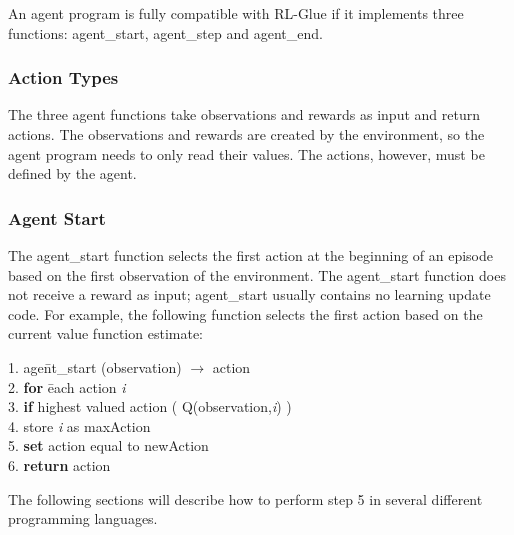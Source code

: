 \documentclass[11pt]{article}
\begin{document}
An agent program is fully compatible with RL-Glue if it implements three functions: agent\_start, agent\_step and agent\_end. 

\subsubsection{Action Types}
The three agent functions take observations and rewards as input and return actions. The observations and rewards are created by the environment, so the agent program needs to only read their values. The actions, however, must be defined by the agent.

\subsubsection{Agent Start}
The agent\_start function selects the first action at the beginning of an episode based on the first observation of the environment. The agent\_start function does not receive a reward as input; agent\_start usually contains no learning update code. For example, the following function selects the first action based on the current value function estimate:
\begin{tabbing}
1. age\=nt\_start (observation) $\rightarrow$ action\\
2. \> {\bf for} \= each action {\it i}\\
3.\>\> {\bf if} highest valued action ( Q(observation,{\it i}) )\\ 
4. \> store {\it i} as maxAction\\
5. \> {\bf set} action equal to newAction\\
6. {\bf return} action
\end{tabbing}
The following sections will describe how to perform step 5 in several different programming languages.
\end{document}
